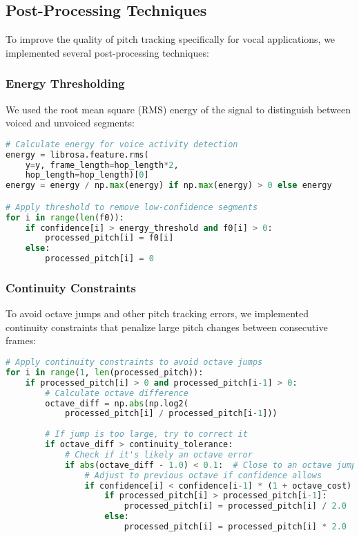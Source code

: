 \documentclass[conference]{IEEEtran}
\begin{document}
\subsection{Post-Processing Techniques}
To improve the quality of pitch tracking specifically for vocal applications, we implemented several post-processing techniques:

\subsubsection{Energy Thresholding}
We used the root mean square (RMS) energy of the signal to distinguish between voiced and unvoiced segments:

\begin{lstlisting}[language=Python]
# Calculate energy for voice activity detection
energy = librosa.feature.rms(
    y=y, frame_length=hop_length*2, 
    hop_length=hop_length)[0]
energy = energy / np.max(energy) if np.max(energy) > 0 else energy

# Apply threshold to remove low-confidence segments
for i in range(len(f0)):
    if confidence[i] > energy_threshold and f0[i] > 0:
        processed_pitch[i] = f0[i]
    else:
        processed_pitch[i] = 0
\end{lstlisting}

\subsubsection{Continuity Constraints}
To avoid octave jumps and other pitch tracking errors, we implemented continuity constraints that penalize large pitch changes between consecutive frames:

\begin{lstlisting}[language=Python]
# Apply continuity constraints to avoid octave jumps
for i in range(1, len(processed_pitch)):
    if processed_pitch[i] > 0 and processed_pitch[i-1] > 0:
        # Calculate octave difference
        octave_diff = np.abs(np.log2(
            processed_pitch[i] / processed_pitch[i-1]))
        
        # If jump is too large, try to correct it
        if octave_diff > continuity_tolerance:
            # Check if it's likely an octave error
            if abs(octave_diff - 1.0) < 0.1:  # Close to an octave jump
                # Adjust to previous octave if confidence allows
                if confidence[i] < confidence[i-1] * (1 + octave_cost):
                    if processed_pitch[i] > processed_pitch[i-1]:
                        processed_pitch[i] = processed_pitch[i] / 2.0
                    else:
                        processed_pitch[i] = processed_pitch[i] * 2.0
\end{lstlisting}
\end{document}
